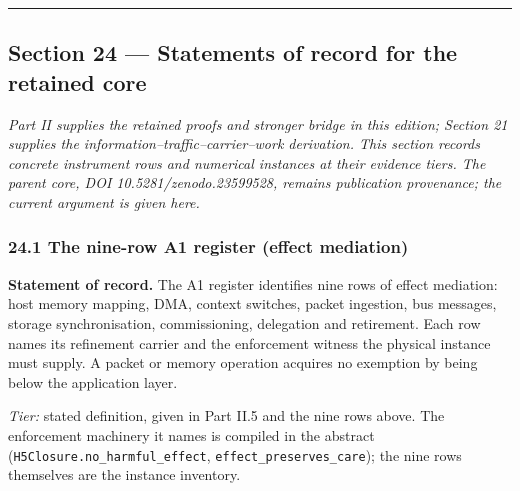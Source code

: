 \documentclass[
]{article}
\begin{document}
\begin{center}\rule{0.5\linewidth}{0.5pt}\end{center}

\subsection{Section 24 --- Statements of record for the retained
core}\label{section-24-statements-of-record-for-the-retained-core}

\emph{Part II supplies the retained proofs and stronger bridge in this
edition; Section 21 supplies the information--traffic--carrier--work
derivation. This section records concrete instrument rows and numerical
instances at their evidence tiers. The parent core, DOI
1\allowbreak{}0\allowbreak{}.\allowbreak{}5\allowbreak{}2\allowbreak{}8\allowbreak{}1\allowbreak{}/\allowbreak{}z\allowbreak{}e\allowbreak{}n\allowbreak{}o\allowbreak{}d\allowbreak{}o\allowbreak{}.\allowbreak{}2\allowbreak{}3\allowbreak{}5\allowbreak{}9\allowbreak{}9\allowbreak{}5\allowbreak{}2\allowbreak{}8\allowbreak{},
remains publication provenance; the current argument is given here.}

\subsubsection{24.1 The nine-row A1 register (effect
mediation)}\label{the-nine-row-a1-register-effect-mediation}

\textbf{Statement of record.} The A1 register identifies nine rows of
effect mediation: host memory mapping, DMA, context switches, packet
ingestion, bus messages, storage synchronisation, commissioning,
delegation and retirement. Each row names its refinement carrier and the
enforcement witness the physical instance must supply. A packet or
memory operation acquires no exemption by being below the application
layer.

\emph{Tier:} stated definition, given in Part II.5 and the nine rows
above. The enforcement machinery it names is compiled in the abstract
(\texttt{H\allowbreak{}5\allowbreak{}C\allowbreak{}l\allowbreak{}o\allowbreak{}s\allowbreak{}u\allowbreak{}r\allowbreak{}e\allowbreak{}.\allowbreak{}n\allowbreak{}o\allowbreak{}\_\allowbreak{}h\allowbreak{}a\allowbreak{}r\allowbreak{}m\allowbreak{}f\allowbreak{}u\allowbreak{}l\allowbreak{}\_\allowbreak{}e\allowbreak{}f\allowbreak{}f\allowbreak{}e\allowbreak{}c\allowbreak{}t},
\texttt{e\allowbreak{}f\allowbreak{}f\allowbreak{}e\allowbreak{}c\allowbreak{}t\allowbreak{}\_\allowbreak{}p\allowbreak{}r\allowbreak{}e\allowbreak{}s\allowbreak{}e\allowbreak{}r\allowbreak{}v\allowbreak{}e\allowbreak{}s\allowbreak{}\_\allowbreak{}c\allowbreak{}a\allowbreak{}r\allowbreak{}e});
the nine rows themselves are the instance inventory.
\end{document}
